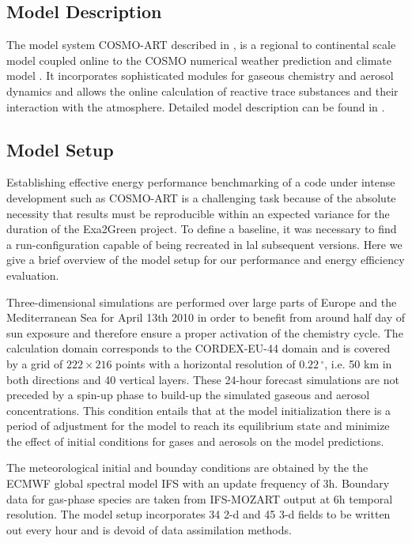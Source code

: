 \subsection{Model Description}
\label{subsec:1.1}
The  model  system COSMO-ART  described  in  \citep{Vogel-2009}, is  a
regional  to  continental scale  model  coupled  online  to the  COSMO
numerical weather  prediction and climate  model \citep{Baldauf-2011}.
It  incorporates  sophisticated  modules  for  gaseous  chemistry  and
aerosol dynamics  and allows the online calculation  of reactive trace
substances and their interaction  with the atmosphere.  Detailed model
description   can  be   found   in  \citep{Bangert-2012,   Knote-2011,
  Knote-2013}.

\subsection{Model Setup}
\label{subsec:1.2}
Establishing effective energy performance benchmarking of a code under
intense development such as COSMO-ART is a challenging task because of
the  absolute necessity that  results must  be reproducible  within an
expected variance for the duration of the Exa2Green project. To define
a baseline,  it was necessary  to find a run-configuration  capable of
being  recreated in  lal subsequent  versions.  Here  we give  a brief
overview of the model setup  for our performance and energy efficiency
evaluation.  

Three-dimensional simulations are performed over large parts of Europe
and the Mediterranean Sea for April 13th 2010 in order to benefit from
around  half  day  of  sun  exposure and  therefore  ensure  a  proper
activation of the chemistry cycle.  The calculation domain corresponds
to the CORDEX-EU-44 domain and is covered by a grid of $222\times 216$
points with  a horizontal resolution of $0.22\,^{\circ}$,  i.e.  50 km
in  both directions and  40 vertical  layers.  These  24-hour forecast
simulations  are not  preceded  by  a spin-up  phase  to build-up  the
simulated gaseous and  aerosol concentrations.  This condition entails
that at the  model initialization there is a  period of adjustment for
the model  to reach its equilibrium  state and minimize  the effect of
initial conditions for gases and aerosols on the model predictions.

The meteorological initial and  bounday conditions are obtained by the
the ECMWF  global spectral model IFS  with an update  frequency of 3h.
Boundary data  for gas-phase species are taken  from IFS-MOZART output
at 6h temporal resolution. The  model setup incorporates 34 2-d and 45
3-d  fields  to be  written  out  every hour  and  is  devoid of  data
assimilation methods.


